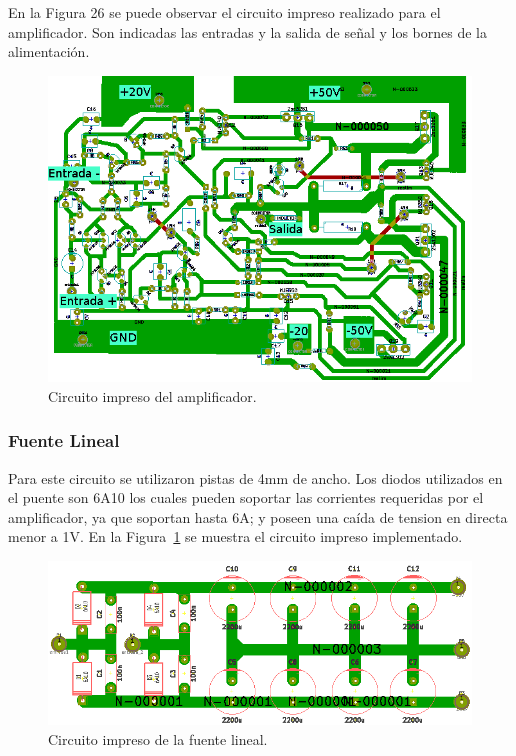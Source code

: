 En la Figura 26 se puede observar el circuito impreso realizado para el amplificador. Son indicadas las entradas y la salida de señal y los bornes de la alimentación.

\begin{figure}[H]
\centerline{
\includegraphics[width=1\textwidth]
{img/PCB1.png}}
\caption{Circuito impreso del amplificador.}
\end{figure}

\subsubsection{Fuente Lineal}
\medskip
Para este circuito se utilizaron pistas de 4mm de ancho. Los diodos utilizados en el puente son 6A10 los cuales pueden soportar las corrientes requeridas por el amplificador, ya que soportan hasta 6A; y poseen una caída de tension en directa menor a 1V.
En la Figura~\ref{circuito_impreso_fuente_lineal} se muestra el circuito impreso implementado. 



\begin{figure}[H]
\centering
\centerline{\includegraphics[width=1\textwidth]{img/circuito_impreso_fuente_lineal.png}}
\caption{Circuito impreso de la fuente lineal.}
\label{circuito_impreso_fuente_lineal} 
\end{figure}
\medskip
